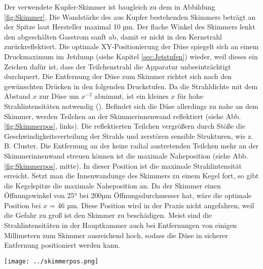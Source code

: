 Der verwendete Kupfer-Skimmer ist baugleich zu dem in Abbildung \ref{fig:Skimmer}. Die Wandstärke des aus Kupfer bestehenden Skimmers beträgt an der Spitze laut Hersteller maximal 10 µm. Der flache Winkel des Skimmers lenkt den abgeschälten Gasstrom sanft ab, damit er nicht in den Kernstrahl zurückreflektiert. 
Die optimale XY-Positionierung der Düse spiegelt sich an einem Druckmaximum im Jetdump (siehe Kapitel \ref{sec:Jetstufen}) wieder, weil dieses ein Zeichen dafür ist, dass der Teilchenstrahl die Apparatur unbeeinträchtigt durchquert. Die Entfernung der Düse zum Skimmer richtet sich nach den gewünschten Drücken in den folgenden Druckstufen.
 Da die Strahldichte mit dem Abstand $x$ zur Düse um $x^{-2}$ abnimmt, ist ein kleines $x$ für hohe Strahlintensitäten notwendig  (\cite{hagena1981nucleation}). Befindet sich die Düse allerdings zu nahe an dem Skimmer, werden Teilchen an der Skimmerinnenwand reflektiert (siehe Abb. \ref{fig:Skimmerpos}, links). Die reflektierten Teilchen vergrößern durch Stöße die Geschwindigkeitsverteilung der Strahls und zerstören sensible Strukturen, wie z. B. Cluster. Die Entfernung an der keine radial austretenden Teilchen mehr an der Skimmerinnenwand streuen können ist die maximale Naheposition (siehe Abb. \ref{fig:Skimmerpos}, mitte). In dieser Position ist die maximale Strahlintensität erreicht. Setzt man die Innenwandunge des Skimmers zu einem Kegel fort, so gibt die Kegelspitze die maximale Naheposition an. Da der Skimmer einen Öffnungswinkel von 25° bei 200µm Öffnungsdurchmesser hat, wäre die optimale Position bei $x$ = 46 µm. Diese Position wird in der Praxis nicht angefahren, weil die Gefahr zu groß ist den Skimmer zu beschädigen. 
Meist sind die Strahlintensitäten in der Hauptkammer auch bei Entfernungen von einigen Millimetern zum Skimmer ausreichend hoch, sodass die Düse in sicherer Entfernung positioniert werden kann.  

 
\begin{center}
\begin{minipage}{\linewidth}
\centering
\texttt{[image: ../skimmerpos.png]}%
 \label{fig:Skimmerpos}
\end{minipage} 
\end{center} 


